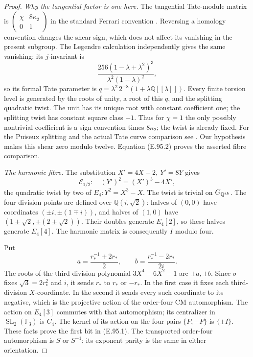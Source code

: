 \begin{proof}
\emph{Why the tangential factor is one here.}
The tangential Tate-module matrix is
\(\left(\begin{smallmatrix}\chi&8\kappa_2\\0&1\end{smallmatrix}\right)\)
in the standard Ferrari convention
\cite[p.446, proof of Theorem~4.16]{SymNTY2010}.
Reversing a homology convention changes the shear sign, which
does not affect its vanishing in the present subgroup.
The Legendre calculation independently gives the same vanishing:
its \(j\)-invariant is
\[
  \frac{256(1-\lambda+\lambda^2)^3}
       {\lambda^2(1-\lambda)^2},
\]
so its formal Tate parameter is
\(q=\lambda^2\,2^{-8}(1+\lambda\mathbb Q[[\lambda]])\).
Every finite torsion level is generated by the roots of unity,
a root of this \(q\), and the splitting quadratic twist.
The unit has its unique root with constant coefficient one;
the splitting twist has constant square class \(-1\).
Thus for \(\chi=1\) the only possibly nontrivial coefficient
is a sign convention times \(8\kappa_2\); the twist is already
fixed.  For the Puiseux splitting and the actual Tate curve
comparison see \citet[\S5.2, pp.449--450; \S5.7, pp.456--458;
Proposition~5.7.3 stated on p.458 and proved on pp.481--482]
{SymNakamura2013}.
Our hypothesis makes this shear zero modulo twelve.
Equation (E.95.2) proves the asserted fibre comparison.

\emph{The harmonic fibre.}
The substitution \(X'=4X-2,\ Y'=8Y\) gives
\[
             \mathcal E_{1/2}:\quad (Y')^2=(X')^3-4X',
\]
the quadratic twist by two of \(E_4:Y^2=X^3-X\).
The twist is trivial on \(G_{\mathbb Q^{\rm ab}}\).
The four-division points are defined over
\(\mathbb Q(i,\sqrt2)\): halves of \((0,0)\) have coordinates
\((\pm i,\pm(1\mp i))\), and halves of \((1,0)\) have
\((1\pm\sqrt2,\pm(2\pm\sqrt2))\).
Their doubles generate \(E_4[2]\), so these halves generate
\(E_4[4]\).  The harmonic matrix is consequently \(I\) modulo four.

Put
\[
 a=\frac{r_*^{-1}+2r_*}{2},\qquad
 b=\frac{r_*^{-1}-2r_*}{2i}.
\]
The roots of the third-division polynomial \(3X^4-6X^2-1\)
are \(\pm a,\pm b\).  Since \(\sigma\) fixes \(\sqrt3=2r_*^2\)
and \(i\), it sends \(r_*\) to \(r_*\) or \(-r_*\).
In the first case it fixes each third-division \(X\)-coordinate.
In the second it sends every such coordinate to its negative,
which is the projective action of the order-four CM automorphism.
The action on \(E_4[3]\) commutes with that automorphism; its
centralizer in \(\operatorname{SL}_2(\mathbb F_3)\) is \(C_4\).
The kernel of its action on the four pairs \(\{P,-P\}\) is
\(\{\pm I\}\).  These facts prove the first bit in (E.95.1).
The transported order-four automorphism is \(S\) or \(S^{-1}\);
its exponent parity is the same in either orientation.


\end{proof}
